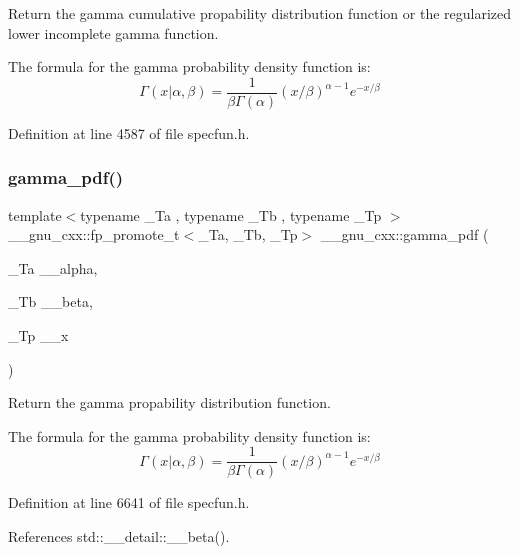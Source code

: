 Return the gamma cumulative propability distribution function or the regularized lower incomplete gamma function. 

The formula for the gamma probability density function is\+: \[ \Gamma(x|\alpha,\beta) = \frac{1}{\beta\Gamma(\alpha)} (x/\beta)^{\alpha - 1} e^{-x/\beta} \] 

Definition at line 4587 of file specfun.\+h.

\mbox{\label{group__gnu__math__spec__func_ga55f530c37387a6c10c601c5838f3be00}} 
\subsubsection{\texorpdfstring{gamma\+\_\+pdf()}{gamma\_pdf()}}
{\footnotesize\ttfamily template$<$typename \+\_\+\+Ta , typename \+\_\+\+Tb , typename \+\_\+\+Tp $>$ \\
\+\_\+\+\_\+gnu\+\_\+cxx\+::fp\+\_\+promote\+\_\+t$<$\+\_\+\+Ta, \+\_\+\+Tb, \+\_\+\+Tp$>$ \+\_\+\+\_\+gnu\+\_\+cxx\+::gamma\+\_\+pdf (\begin{DoxyParamCaption}\item[{\+\_\+\+Ta}]{\+\_\+\+\_\+alpha,  }\item[{\+\_\+\+Tb}]{\+\_\+\+\_\+beta,  }\item[{\+\_\+\+Tp}]{\+\_\+\+\_\+x }\end{DoxyParamCaption})\hspace{0.3cm}{\ttfamily [inline]}}



Return the gamma propability distribution function. 

The formula for the gamma probability density function is\+: \[ \Gamma(x|\alpha,\beta) = \frac{1}{\beta\Gamma(\alpha)} (x/\beta)^{\alpha - 1} e^{-x/\beta} \] 

Definition at line 6641 of file specfun.\+h.



References std\+::\+\_\+\+\_\+detail\+::\+\_\+\+\_\+beta().

\mbox{\label{group__gnu__math__spec__func_gac9a59be05877d3c14fa95bebcf15e8df}} 
